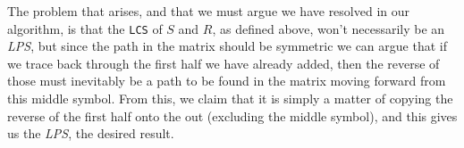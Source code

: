 \documentclass[11pt,english]{article}
\begin{document}
The problem that arises, and that we must argue we have resolved in our
algorithm, is that the \texttt{LCS} of $S$ and $R$, as defined above, won't
necessarily be an \textit{LPS}, but since the path in the matrix should be
symmetric we can argue that if we trace back through the first half we have
already added, then the reverse of those must inevitably be a path to be found
in the matrix moving forward from this middle symbol. From this, we claim that
it is simply a matter of copying the reverse of the first half onto the out
(excluding the middle symbol), and this gives us the \textit{LPS}, the desired
result.








\end{document}
